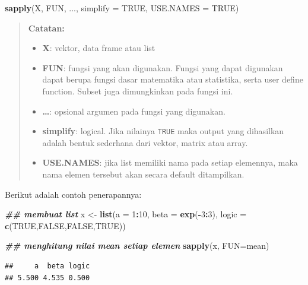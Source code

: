 \documentclass[
]{book}
\newenvironment{Shaded}{\begin{snugshade}}{\end{snugshade}}
\newcommand{\AttributeTok}[1]{\textcolor[rgb]{0.13,0.29,0.53}{#1}}
\newcommand{\ConstantTok}[1]{\textcolor[rgb]{0.56,0.35,0.01}{#1}}
\newcommand{\DecValTok}[1]{\textcolor[rgb]{0.00,0.00,0.81}{#1}}
\newcommand{\DocumentationTok}[1]{\textcolor[rgb]{0.56,0.35,0.01}{\textbf{\textit{#1}}}}
\newcommand{\FunctionTok}[1]{\textcolor[rgb]{0.13,0.29,0.53}{\textbf{#1}}}
\newcommand{\NormalTok}[1]{#1}
\newcommand{\OtherTok}[1]{\textcolor[rgb]{0.56,0.35,0.01}{#1}}
\newcommand{\SpecialCharTok}[1]{\textcolor[rgb]{0.81,0.36,0.00}{\textbf{#1}}}
\providecommand{\tightlist}{%
  \setlength{\itemsep}{0pt}\setlength{\parskip}{0pt}}
\theoremstyle{definition}
\theoremstyle{definition}
\theoremstyle{definition}
\theoremstyle{definition}
\theoremstyle{remark}
\begin{document}
\begin{Shaded}
\begin{Highlighting}[]
\FunctionTok{sapply}\NormalTok{(X, FUN, ..., }\AttributeTok{simplify =} \ConstantTok{TRUE}\NormalTok{, }\AttributeTok{USE.NAMES =} \ConstantTok{TRUE}\NormalTok{)}
\end{Highlighting}
\end{Shaded}

\begin{quote}
\textbf{Catatan:}

\begin{itemize}
\tightlist
\item
  \textbf{X}: vektor, data frame atau list
\item
  \textbf{FUN}: fungsi yang akan digunakan. Fungsi yang dapat digunakan dapat berupa fungsi dasar matematika atau statistika, serta user define function. Subset juga dimungkinkan pada fungsi ini.
\item
  \textbf{\ldots{}}: opsional argumen pada fungsi yang digunakan.
\item
  \textbf{simplify}: logical. Jika nilainya \texttt{TRUE} maka output yang dihasilkan adalah bentuk sederhana dari vektor, matrix atau array.
\item
  \textbf{USE.NAMES}: jika list memiliki nama pada setiap elemennya, maka nama elemen tersebut akan secara default ditampilkan.
\end{itemize}
\end{quote}

Berikut adalah contoh penerapannya:

\begin{Shaded}
\begin{Highlighting}[]
\DocumentationTok{\#\# membuat list}
\NormalTok{x }\OtherTok{\textless{}{-}} \FunctionTok{list}\NormalTok{(}\AttributeTok{a =} \DecValTok{1}\SpecialCharTok{:}\DecValTok{10}\NormalTok{, }\AttributeTok{beta =} \FunctionTok{exp}\NormalTok{(}\SpecialCharTok{{-}}\DecValTok{3}\SpecialCharTok{:}\DecValTok{3}\NormalTok{), }\AttributeTok{logic =} \FunctionTok{c}\NormalTok{(}\ConstantTok{TRUE}\NormalTok{,}\ConstantTok{FALSE}\NormalTok{,}\ConstantTok{FALSE}\NormalTok{,}\ConstantTok{TRUE}\NormalTok{))}

\DocumentationTok{\#\# menghitung nilai mean setiap elemen}
\FunctionTok{sapply}\NormalTok{(x, }\AttributeTok{FUN=}\NormalTok{mean)}
\end{Highlighting}
\end{Shaded}

\begin{verbatim}
##     a  beta logic 
## 5.500 4.535 0.500
\end{verbatim}
\end{document}
